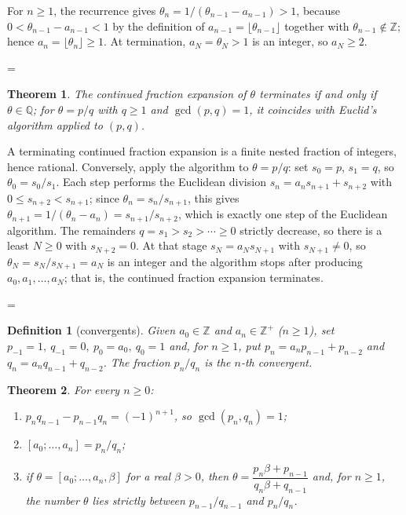 \documentclass[11pt]{article}
\makeatletter
\theoremstyle{ntstyle}
\newtheorem{theorem}{Theorem}[subsection]
\newtheorem{definition}{Definition}[subsection]
\let\nt@closedisplay\]
\def\nt@guardedclose{\@ifnextchar\par{\nt@closeafterpar}{\@ifnextchar\end{\postdisplaypenalty\@M\nt@closedisplay}{\nt@closedisplay}}}
\def\nt@closeafterpar\par{\@ifnextchar\par{\nt@closeafterpar}{\@ifnextchar\end{\postdisplaypenalty\@M\nt@closedisplay\par}{\nt@closedisplay\par}}}
\renewenvironment{proof}[1][\proofname]{\par
  \pushQED{\qed}\normalfont\topsep\medskipamount\edef\nt@afterproof{\@endparpenalty=\the\@endparpenalty\relax}\@beginparpenalty\@M\@endparpenalty\@M\let\]\nt@guardedclose\trivlist\item[]\textit{#1\@addpunct{.}} \ignorespaces}{\ifvmode\addpenalty\@M\fi\popQED\nt@afterproof\endtrivlist\@endpefalse}
\makeatother
\begin{document}
\begin{proof} For $n\ge1$, the recurrence gives
	$\theta_n=1/(\theta_{n-1}-a_{n-1})>1$, because
	$0<\theta_{n-1}-a_{n-1}<1$ by the definition of $a_{n-1}=\lfloor
		\theta_{n-1}\rfloor$ together with $\theta_{n-1}\notin\mathbb{Z}$; hence
	$a_n=\lfloor\theta_n\rfloor\ge1$. At termination, $a_N=\theta_N>1$ is an
	integer, so $a_N\ge2$.

\end{proof}
\begin{theorem}\label{thm:10.3.2} The continued fraction expansion of $\theta$
	terminates if and only if $\theta\in\mathbb{Q}$; for $\theta=p/q$
	with $q\ge1$ and $\gcd(p, q)=1$, it coincides with Euclid's algorithm applied to $(p,q)$.

\end{theorem}

\begin{proof} A terminating continued fraction expansion is a finite nested
	fraction of integers, hence rational. Conversely, apply the algorithm to
	$\theta=p/q$: set $s_0=p$, $s_1=q$, so $\theta_0=s_0/s_1$. Each step performs
	the Euclidean division $s_n=a_ns_{n+1}+s_{n+2}$ with
	$0\le s_{n+2}<s_{n+1}$; since $\theta_n=s_n/s_{n+1}$, this gives
	$\theta_{n+1}=1/(\theta_n-a_n)=s_{n+1}/s_{n+2}$, which is exactly one step of the Euclidean algorithm. The remainders $q=s_1>s_2>\cdots\ge0$ strictly decrease,
	so there is a least $N\ge0$ with $s_{N+2}=0$. At that stage
	$s_N=a_Ns_{N+1}$ with $s_{N+1}\neq0$, so
	$\theta_N=s_N/s_{N+1}=a_N$ is an integer and the algorithm stops after
	producing $a_0,a_1,\ldots,a_N$; that is, the continued fraction expansion
	terminates.

\end{proof}
\begin{definition}[convergents]\label{def:10.3.2} Given
	$a_0\in\mathbb{Z}$ and $a_n\in\mathbb{Z}^+$ ($n\ge1$), set
	$p_{-1}=1,\ q_{-1}=0,\ p_0=a_0,\ q_0=1$ and, for $n\ge1$,
	put $p_n=a_np_{n-1}+p_{n-2}$ and $q_n=a_nq_{n-1}+q_{n-2}$. The fraction
	$p_n/q_n$ is the $n$-th convergent.

\end{definition}
\begin{theorem}\label{thm:10.3.3} For every $n\ge0$:
	\begin{enumerate}[label={\alph*)}]
		\item $p_nq_{n-1}-p_{n-1}q_n=(-1)^{n+1}$, so
		      $\gcd(p_n, q_n)=1$;
		\item $[a_0;\ldots,a_n]=p_n/q_n$;
		\item if $\theta=[a_0;\ldots,a_n,\beta]$ for a real $\beta>0$, then
		      $\theta=\dfrac{p_n\beta+p_{n-1}}{q_n\beta+q_{n-1}}$ and, for
		      $n\ge1$, the number $\theta$ lies strictly between
		      $p_{n-1}/q_{n-1}$ and $p_n/q_n$.
	\end{enumerate}

\end{theorem}
\end{document}
